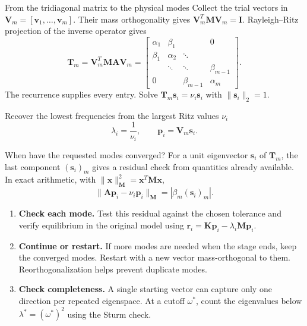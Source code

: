 \documentclass[aspectratio=169]{beamer}
\begin{document}
\begin{frame}{From the tridiagonal matrix to the physical modes}
  \small
  Collect the trial vectors in $\mathbf V_m=[\mathbf v_1,\ldots,\mathbf v_m]$.
  Their mass orthogonality gives $\mathbf V_m^T\mathbf M\mathbf V_m=\mathbf I$.
  Rayleigh--Ritz projection of the inverse operator gives
  \[
    \mathbf T_m=\mathbf V_m^T\mathbf M\mathbf A\mathbf V_m
    =\begin{bmatrix}
      \alpha_1 & \beta_1  &             & 0           \\
      \beta_1  & \alpha_2 & \ddots      &             \\
               & \ddots   & \ddots      & \beta_{m-1} \\
      0        &          & \beta_{m-1} & \alpha_m
    \end{bmatrix}.
  \]
  The recurrence supplies every entry. Solve
  $\mathbf T_m\mathbf s_i=\nu_i\mathbf s_i$ with $\|\mathbf s_i\|_2=1$.
  \begin{block}{Recover the lowest frequencies from the largest Ritz values $\nu_i$}
    \[
      \lambda_i=\frac{1}{\nu_i},\qquad
      {\mathbf p}_i=\mathbf V_m\mathbf s_i .
    \]
  \end{block}
\end{frame}

\begin{frame}{When have the requested modes converged?}
  \small
  For a unit eigenvector $\mathbf s_i$ of $\mathbf T_m$, the last component
  $(\mathbf s_i)_m$ gives a residual check from quantities already available.
  In exact arithmetic, with $\|\mathbf x\|_{\mathbf M}^2=\mathbf x^T\mathbf M\mathbf x$,
  \[
    \|\mathbf A{\mathbf p}_i-\nu_i{\mathbf p}_i\|_{\mathbf M}
    =|\beta_m(\mathbf s_i)_m|.
  \]
  \begin{enumerate}
    \item \textbf{Check each mode.} Test this residual against the chosen
          tolerance and verify equilibrium in the original model using
          ${\mathbf r}_i=\mathbf K{\mathbf p}_i-\lambda_i\mathbf M{\mathbf p}_i$.
    \item \textbf{Continue or restart.} If more modes are needed when the
          stage ends, keep the converged modes. Restart with a new vector
          mass-orthogonal to them. Reorthogonalization helps prevent duplicate modes.
    \item \textbf{Check completeness.} A single starting vector can capture
          only one direction per repeated eigenspace. At a cutoff $\omega^*$,
          count the eigenvalues below $\lambda^*=(\omega^*)^2$ using the Sturm check.
  \end{enumerate}
\end{frame}
\end{document}
